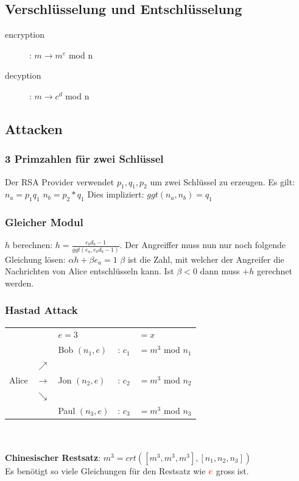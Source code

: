 \documentclass[10pt]{article}
\begin{document}
\subsection{Verschlüsselung und Entschlüsselung}
\begin{description}
	\item[encryption] : $m \longrightarrow m^e$ mod n
	\item[decyption] : $m \longrightarrow c^d$ mod n
\end{description} 
\subsection{Attacken}
\subsubsection{3 Primzahlen für zwei Schlüssel}
Der RSA Provider verwendet $p_1, q_1, p_2$ um zwei Schlüssel zu erzeugen. Es gilt: $n_a = p_1 q_1$ $n_b = p_2*q_1$ Dies impliziert: $ggt(n_a, n_b) = q_1$
\subsubsection{Gleicher Modul}
$h$ berechnen: $ h = \frac{e_b d_b - 1}{ggt(e_a, e_b d_b -1)}$. Der
Angreiffer muss nun nur noch folgende Gleichung lösen: $\alpha h + \beta e_a = 1$ $\beta$ ist die Zahl, mit welcher der Angreifer die Nachrichten von Alice entschlüsseln kann. Ist $\beta < 0$ dann muss $+h$ gerechnet werden.
\subsubsection{Hastad Attack}
\begin{tabular}{l l l l l}
    & & {\color{red} $e=3$} & & $=x$ \\
	&  & Bob $(n_1,e)$ & : {\color{red}$c_1$} & $= m^3$ mod $n_1$\\
	&$\nearrow$  \\
	Alice & $\rightarrow$ & Jon $(n_2,e)$ & : {\color{red}$c_2$} & $= m^3$ mod $n_2$\\
	& $\searrow$ \\
	& & Paul $(n_3,e)$ & : {\color{red}$c_3$} & $= m^3$ mod $n_3$
\end{tabular} \\ \\
\textbf{Chinesischer Restsatz}: $m^3= crt([m^3,m^3,m^3],[n_1,n_2,n_3])$ \\
Es benötigt so viele Gleichungen für den Restsatz wie ${\color{red}e}$ gross ist.
\end{document}
